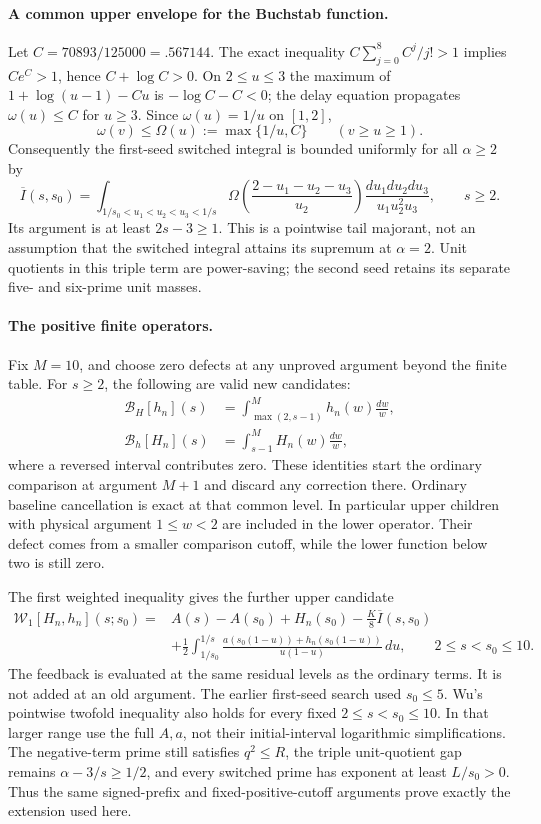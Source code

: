 \paragraph{A common upper envelope for the Buchstab function.}
Let $C=70893/125000=.567144$. The exact inequality
$C\sum_{j=0}^{8}C^j/j!>1$ implies $Ce^C>1$, hence
$C+\log C>0$. On $2\le u\le3$ the maximum of
$1+\log(u-1)-Cu$ is $-\log C-C<0$; the delay equation propagates
$\omega(u)\le C$ for $u\ge3$. Since $\omega(u)=1/u$ on $[1,2]$,
\[
 \omega(v)\le\Omega(u):=\max\{1/u,C\}\qquad(v\ge u\ge1).
\]
Consequently the first-seed switched integral is bounded uniformly
for all $\alpha\ge2$ by
\[
 \overline I(s,s_0)=
 \int_{1/s_0<u_1<u_2<u_3<1/s}
 \Omega\!\left(\frac{2-u_1-u_2-u_3}{u_2}\right)
              \frac{du_1du_2du_3}{u_1u_2^2u_3},\qquad s\ge2.
\]
Its argument is at least $2s-3\ge1$. This is a pointwise tail
majorant, not an assumption that the switched integral attains its
supremum at $\alpha=2$. Unit quotients in this triple term are
power-saving; the second seed retains its separate five- and
six-prime unit masses.

\paragraph{The positive finite operators.}
Fix $M=10$, and choose zero defects at any unproved argument beyond
the finite table. For $s\ge2$, the following are valid new candidates:
\begin{align*}
 \mathcal B_H[h_n](s)&=\int_{\max(2,s-1)}^M h_n(w)\frac{dw}{w},\\
 \mathcal B_h[H_n](s)&=\int_{s-1}^M H_n(w)\frac{dw}{w},
\end{align*}
where a reversed interval contributes zero. These identities start
the ordinary comparison at argument $M+1$ and discard any correction
there. Ordinary baseline cancellation is exact at that common level.
In particular upper children with physical argument $1\le w<2$
are included in the lower operator. Their defect comes from a
smaller comparison cutoff, while the lower function below two is
still zero.

The first weighted inequality gives the further upper candidate
\begin{align*}
 \mathcal W_1[H_n,h_n](s;s_0)
 ={}& A(s)-A(s_0)+H_n(s_0)-\frac K8\overline I(s,s_0)\\
 &+\frac12\int_{1/s_0}^{1/s}
       \frac{a(s_0(1-u))+h_n(s_0(1-u))}{u(1-u)}\,du,
 \qquad 2\le s<s_0\le10.
\end{align*}
The feedback is evaluated at the same residual levels as the
ordinary terms. It is not added at an old argument.
The earlier first-seed search used $s_0\le5$. Wu's pointwise
twofold inequality also holds for every fixed $2\le s<s_0\le10$.
In that larger range use the full $A,a$, not their initial-interval
logarithmic simplifications. The negative-term prime still satisfies
$q^2\le R$, the triple unit-quotient gap remains
$\alpha-3/s\ge1/2$, and every switched prime has exponent at least
$L/s_0>0$. Thus the same signed-prefix and fixed-positive-cutoff
arguments prove exactly the extension used here.

